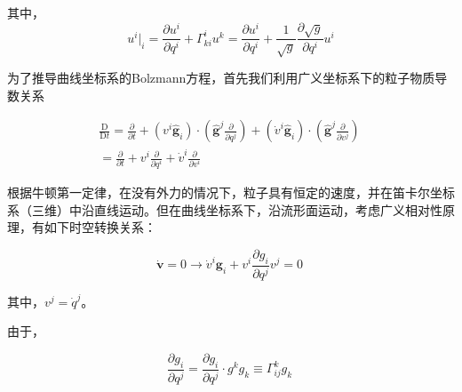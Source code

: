 \documentclass[LBMDerivation.tex]{subfiles}
\begin{document}
其中，
\begin{equation}
  u^{i}|_{i}=\frac{\partial u^{i}}{\partial q^{i}}+\Gamma_{k i}^{i} u^{k}=\frac{\partial u^{i}}{\partial q^{i}}+\frac{1}{\sqrt{g}} \frac{\partial \sqrt{g}}{\partial q^{i}} u^{i}
\end{equation}







为了推导曲线坐标系的Bolzmann方程，首先我们利用广义坐标系下的粒子物质导数关系

\begin{equation}
  \begin{aligned}
    \frac{\mathrm{D}}{\mathrm{D} t}=\frac{\partial}{\partial t}+\left(v^{i} \widehat{\boldsymbol{g}}_{i}\right) \cdot\left(\widehat{\boldsymbol{g}}^{j} \frac{\partial}{\partial q^{j}}\right)+\left(\dot{v}^{i} \widehat{\boldsymbol{g}}_{i}\right) \cdot\left(\widehat{\boldsymbol{g}}^{j} \frac{\partial}{\partial v^{j}}\right) \\
    =\frac{\partial}{\partial t}+v^{i} \frac{\partial}{\partial q^{i}} + \dot{v}^{i} \frac{\partial}{\partial  v^{i}}
  \end{aligned}
  \label{EQUATION::广义物质导数} ~
\end{equation}

根据牛顿第一定律，在没有外力的情况下，粒子具有恒定的速度，并在笛卡尔坐标系（三维）中沿直线运动。但在曲线坐标系下，沿流形面运动，考虑广义相对性原理，有如下时空转换关系：

%
%
\begin{equation}
  \dot{\boldsymbol{v}}=0 \rightarrow \dot{v}^{i}\boldsymbol{g}_{i}+v^{i} \frac{\partial g_{i}}{\partial q^{j}} v^{j}=0
  \label{EQUATION::A.3} ~
\end{equation}
%

其中，$v^{j}=\dot{q}^{j}$。
%
%

由于，

\begin{equation}
  \frac{\partial g_{i}}{\partial q^{j}}=\frac{\partial g_{i}}{\partial q^{j}} \cdot g^{k} g_{k} \equiv \Gamma_{i j}^{k} g_{k}
  \label{EQUATION::A.4} ~
\end{equation}
%
%
\end{document}
